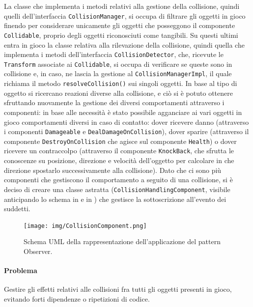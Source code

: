 \documentclass[a4paper,12pt]{report}
\begin{document}
La classe che implementa i metodi relativi alla gestione della collisione, quindi quelli dell'interfaccia \texttt{CollisionManager}, si occupa di filtrare gli oggetti in gioco finendo per considerare unicamente gli oggetti che posseggono il componente \texttt{Collidable}, proprio degli oggetti riconosciuti come tangibili.
Su questi ultimi entra in gioco la classe relativa alla rilevazione della collisione, quindi quella che implementa i metodi dell'interfaccia \texttt{CollisionDetector}, che, ricevute le \texttt{Transform} associate ai \texttt{Collidable}, si occupa di verificare se queste sono in collisione e, in caso, ne lascia la gestione al \texttt{CollisionManagerImpl}, il quale richiama il metodo \texttt{resolveCollision()} sui singoli oggetti.
In base al tipo di oggetto si ricercano reazioni diverse alla collisione, e ciò si è potuto ottenere sfruttando nuovamente la gestione dei diversi comportamenti attraverso i componenti: in base alle necessità è stato possibile agganciare ai vari oggetti in gioco comportamenti diversi in caso di contatto: dover ricevere danno (attraverso i componenti \texttt{Damageable} e \texttt{DealDamageOnCollision}), dover sparire (attraverso il componente \texttt{DestroyOnCollision} che agisce sul componente \texttt{Health}) o dover ricevere un contraccolpo (attraverso il componente \texttt{KnockBack}, che sfrutta le conoscenze su posizione, direzione e velocità dell'oggetto per calcolare in che direzione spostarlo successivamente alla collisione).
Dato che ci sono più componenti che gestiscono il comportamento a seguito di una collisione, si è deciso di creare una classe astratta (\texttt{CollisionHandlingComponent}, visibile anticipando lo schema in  e in ) che gestisce la sottoscrizione all'evento dei suddetti.
%
\begin{figure}[H]
    \centering{}
    \texttt{[image: img/CollisionComponent.png]}
    \caption{Schema UML della rappresentazione dell'applicazione del pattern Observer.}
\end{figure}
%
\paragraph*{Problema}
Gestire gli effetti relativi alle collisioni fra tutti gli oggetti presenti in gioco, evitando forti dipendenze o ripetizioni di codice.
\end{document}

